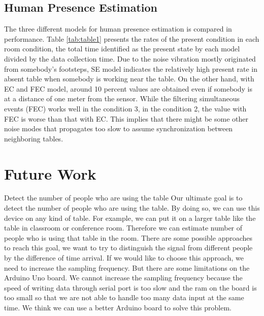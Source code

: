 \documentclass{sig-alternate-ipsn13}
\begin{document}




\subsection{Human Presence Estimation}
The three different models for human presence estimation is compared in performance. Table \ref{tab:table1} presents the rates of the present condition in each room condition, the total time identified as the present state by each model divided by the data collection time. Due to the noise vibration mostly originated from somebody’s footsteps, SE model indicates the relatively high present rate in absent table when somebody is working near the table. On the other hand, with EC and FEC model, around 10 percent values are obtained even if somebody is at a distance of one meter from the sensor. While the filtering simultaneous events (FEC) works well in the condition 3, in the condition 2, the value with FEC is worse than that with EC. This implies that there might be some other noise modes that propagates too slow to assume synchronization between neighboring tables.


\section{Future Work}

Detect the number of people who are using the table
Our ultimate goal is to detect the number of people who are using the table. By doing so, we can use this device on any kind of table. For example, we can put it on a larger table like the table in classroom or conference room. Therefore we can estimate number of people who is using that table in the room. There are some possible approaches to reach this goal, we want to try to distinguish the signal from different people by the difference of time arrival. If we would like to choose this approach, we need to increase the sampling frequency. But there are some limitations on the Arduino Uno board. We cannot increase the sampling frequency because the speed of writing data through serial port is too slow and the ram on the board is too small so that we are not able to handle too many data input at the same time. We think we can use a better Arduino board to solve this problem. 
\end{document}
